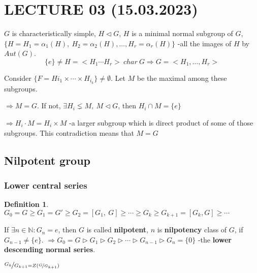 \documentclass[12pt, a4paper]{article}
\theoremstyle{definition}
\newtheorem{definition}{Definition}[section]
\begin{document}
\section{LECTURE 03 (15.03.2023)}
$G$ is characteristically simple, $H\lhd G$, $H$ is a minimal normal subgroup of $G$, 
$\{H=H_1=\alpha_1(H),\ H_2=\alpha_2(H),\ldots, H_r=\alpha_r(H)\} $ -all the images of 
$H$ by $Aut(G)$.
\[\{e\} \neq H= <H_1\cdots H_r>\ char\ G\Rightarrow G = <H_1,\ldots,H_r>\]
\par
Consider $\{F= H{i_1}\times \cdots \times H_{i_k} \}\neq \emptyset $. Let $M$ be the maximal
among these subgroups.
\par
$\Rightarrow M=G$. If not, $\exists H_i\lneq M,\ M\lhd G $, then $H_i\cap M=\{e\}$ \par
$\Rightarrow H_i \cdot M =H_i\times M $ -a larger subgroup which is direct product of some of 
those subgroups. This contradiction means that $M=G$
\subsection{Nilpotent group}
\subsubsection{Lower central series}
\begin{definition}
    $G_0=G\geqslant G_1=G'\geqslant G_2 = [G_1,\ G] \geqslant \cdots \geqslant G_k \geqslant 
    G_{k+1} =[G_k, G] \geqslant \cdots$
    \par
    If $\exists n \in \mathbb{N}: G_n = {e}$, then $G$ is called \textbf{nilpotent}, $n$ is 
    \textbf{nilpotency} class of $G$, if $G_{n-1} \neq \{e\}$.
    $\Rightarrow G_0 = G\rhd G_1 \rhd G_2 \rhd \cdots \rhd G_{n-1} \rhd G_n = \{0\} $ -the 
    \textbf{lower descending normal series}.
    \par
    $\nicefrac{G_k}{G_{k+1} = Z(\nicefrac{G}{G_{k+1}})} $
\end{definition}
\end{document}
